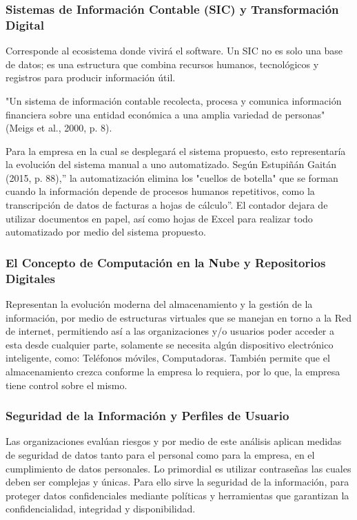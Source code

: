 \subsubsection{Sistemas de Información Contable (SIC) y Transformación Digital}

Corresponde al ecosistema donde vivirá el software. Un SIC no es solo una base de datos; es una estructura que combina recursos humanos, tecnológicos y registros para producir información útil.

"Un sistema de información contable recolecta, procesa y comunica información financiera sobre una entidad económica a una amplia variedad de personas" (Meigs et al., 2000, p. 8).

Para la empresa en la cual se desplegará el sistema propuesto, esto representaría la evolución del sistema manual a uno automatizado. Según Estupiñán Gaitán (2015, p. 88),'' la automatización elimina los "cuellos de botella" que se forman cuando la información depende de procesos humanos repetitivos, como la transcripción de datos de facturas a hojas de cálculo''. El contador dejara de utilizar documentos en papel, así como hojas de Excel para realizar todo automatizado por medio del sistema propuesto.

\subsubsection{El Concepto de Computación en la Nube y Repositorios Digitales}

Representan la evolución moderna del almacenamiento y la gestión de la información, por medio de estructuras virtuales que se manejan en torno a la Red de internet, permitiendo así a las organizaciones y/o usuarios poder acceder a esta desde cualquier parte, solamente se necesita algún dispositivo electrónico inteligente, como: Teléfonos móviles, Computadoras. También permite que el almacenamiento crezca conforme la empresa lo requiera, por lo que, la empresa tiene control sobre el mismo.

\subsubsection{Seguridad de la Información y Perfiles de Usuario}

Las organizaciones evalúan riesgos y por medio de este análisis aplican medidas de seguridad de datos tanto para el personal como para la empresa, en el cumplimiento de datos personales. Lo primordial es utilizar contraseñas las cuales deben ser complejas y únicas. Para ello sirve la seguridad de la información, para proteger datos confidenciales mediante políticas y herramientas que garantizan la confidencialidad, integridad y disponibilidad.

